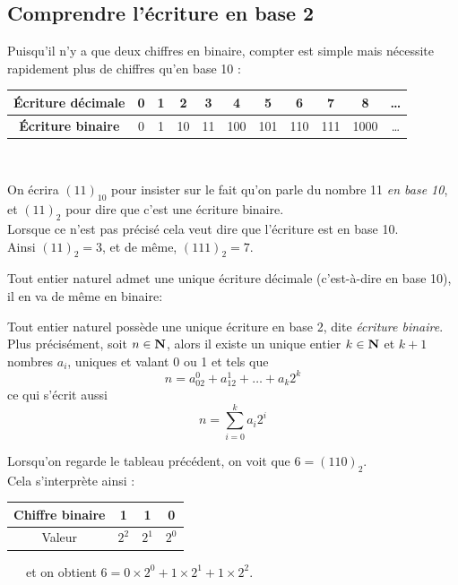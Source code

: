 \subsection{Comprendre l'écriture en base 2}

Puisqu'il n'y a que deux chiffres en binaire, compter est simple mais nécessite rapidement plus de chiffres qu'en base
10 :\\

\begin{center}
    \alternaterowcolors
    \begin{tabular}{|c|c|c|c|c|c|c|c|c|c|c|}
        \hline
        \textbf{\'Ecriture décimale} & 0 & 1 & 2  & 3  & 4   & 5   & 6   & 7   & 8    & \dots \\
        \hline
        \textbf{\'Ecriture binaire}  & 0 & 1 & 10 & 11 & 100 & 101 & 110 & 111 & 1000 & \dots \\
        \hline
    \end{tabular} \\[1em]
\end{center}

\begin{notation}
    On écrira $(11)_{10}$ pour insister sur le fait qu'on parle du nombre 11 \textit{en base 10}, et $(11)_2$ pour dire que c'est une écriture
    binaire.\\
    Lorsque ce n'est pas précisé cela veut dire que l'écriture est en base 10.\\
    Ainsi $(11)_2=3$, et de même, $(111)_2=7$.\\
\end{notation}


Tout entier naturel admet une unique écriture décimale (c'est-à-dire en base 10), il en va de même en binaire:
\begin{propriete}
    Tout entier naturel possède une unique écriture en base 2, dite \textit{écriture binaire}.
    Plus précisément, soit $n\in\mathbf{N}$, alors il existe un unique entier $k\in\mathbf{N}$ et $k+1$ nombres $a_i$, uniques et valant 0
    ou 1 et tels que $$n=a_02^0+a_12^1+\ldots+a_k2^k$$
    ce qui s'écrit aussi
    $$n=\sum_{i=0}^ka_i2^i$$
\end{propriete}
\begin{exemple}
    Lorsqu'on regarde le tableau précédent, on voit que $6=(110)_2$.\\Cela s'interprète ainsi :\\

    \alternaterowcolors
    \begin{tabular}{|c|c|c|c|}
        \hline
        Chiffre binaire & 1     & 1     & 0     \\
        \hline
        Valeur          & $2^2$ & $2^1$ & $2^0$ \\
        \hline
    \end{tabular}\ \ \ et on obtient $6=0\times 2^0+1\times 2^1+1\times 2^2$.
\end{exemple}

